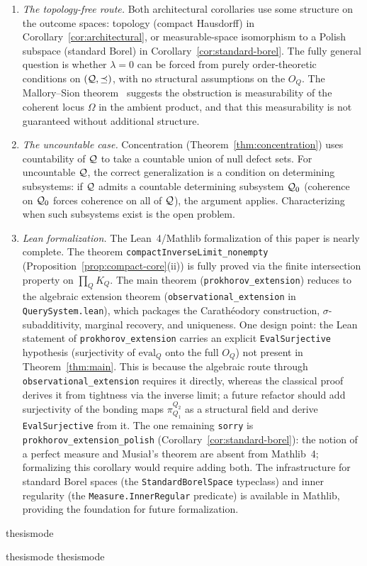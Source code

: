 \begin{enumerate}
\item \emph{The topology-free route.}
Both architectural corollaries use some structure on the outcome
spaces: topology (compact Hausdorff) in Corollary~\ref{cor:architectural},
or measurable-space isomorphism to a Polish subspace (standard Borel)
in Corollary~\ref{cor:standard-borel}.  The fully general question
is whether $\lambda = 0$ can be forced from purely order-theoretic
conditions on $(\mathcal{Q}, \preceq)$, with no structural assumptions
on the $O_Q$.  The Mallory--Sion theorem~\cite{MallorySion1971}
suggests the obstruction is measurability of the coherent locus
$\Omega$ in the ambient product, and that this measurability is not
guaranteed without additional structure.

\item \emph{The uncountable case.}
Concentration (Theorem~\ref{thm:concentration}) uses countability
of $\mathcal{Q}$ to take a countable union of null defect sets.  For
uncountable $\mathcal{Q}$, the correct generalization is a condition on
determining subsystems: if $\mathcal{Q}$ admits a countable determining
subsystem $\mathcal{Q}_0$ (coherence on $\mathcal{Q}_0$ forces coherence on
all of $\mathcal{Q}$), the argument applies.  Characterizing when such
subsystems exist is the open problem.

\item \emph{Lean formalization.}
The Lean~4/Mathlib formalization of this paper is nearly complete.
The theorem \texttt{compactInverseLimit\_nonempty}
(Proposition~\ref{prop:compact-core}(ii))
is fully proved via the finite intersection property on
$\prod_Q K_Q$.  The main theorem (\texttt{prokhorov\_extension})
reduces to the algebraic extension theorem
(\texttt{observational\_extension} in \texttt{QuerySystem.lean}),
which packages the Carath\'eodory construction, $\sigma$-subadditivity,
marginal recovery, and uniqueness.  One design point: the Lean
statement of \texttt{prokhorov\_extension} carries an explicit
\texttt{EvalSurjective} hypothesis (surjectivity of $\mathrm{eval}_Q$
onto the full $O_Q$) not present in Theorem~\ref{thm:main}.  This
is because the algebraic route through
\texttt{observational\_extension} requires it directly, whereas the
classical proof derives it from tightness via the inverse limit;
a future refactor should add surjectivity of the bonding maps
$\pi^{Q_2}_{Q_1}$ as a structural field and derive
\texttt{EvalSurjective} from it.  The one remaining \texttt{sorry}
is \texttt{prokhorov\_extension\_polish}
(Corollary~\ref{cor:standard-borel}): the notion of a perfect measure
and Musia{\l}'s theorem are absent from Mathlib~4; formalizing this
corollary would require adding both.  The infrastructure for standard Borel spaces
(the \texttt{StandardBorelSpace} typeclass) and inner regularity
(the \texttt{Measure.InnerRegular} predicate) is available in
Mathlib, providing the foundation for future formalization.
\end{enumerate}

\ifcsname thesismode\endcsname\else


\fi

\ifcsname thesismode\endcsname\else
\ifcsname thesismode\endcsname\else\fi
\fi
